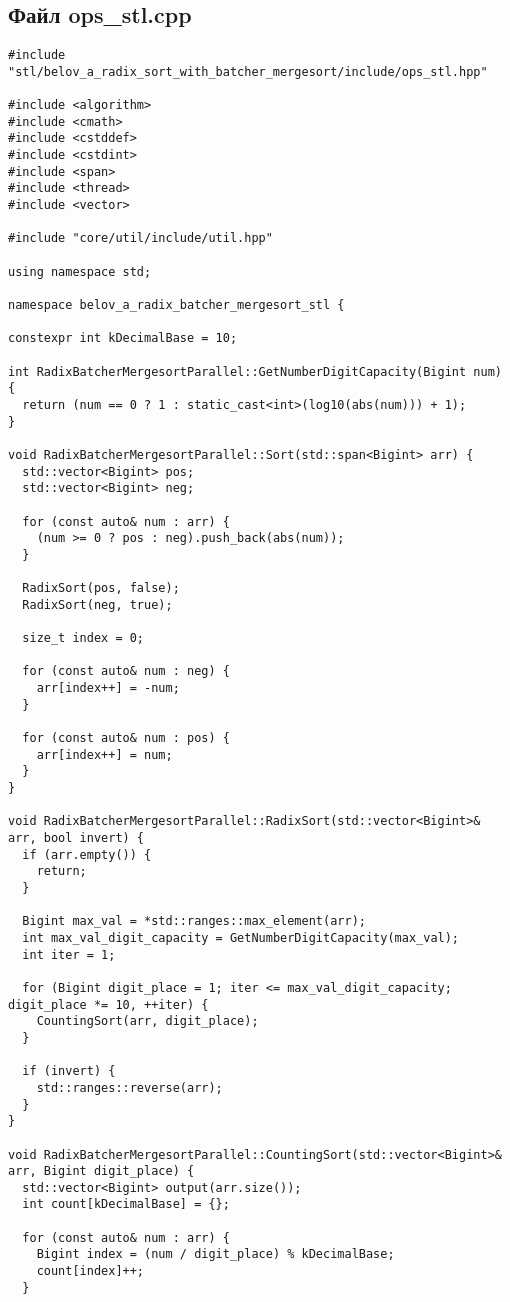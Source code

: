 \documentclass[a4paper,12pt]{article}
\begin{document}
\subsection*{Файл ops\_stl.cpp}
\begin{lstlisting}
#include "stl/belov_a_radix_sort_with_batcher_mergesort/include/ops_stl.hpp"

#include <algorithm>
#include <cmath>
#include <cstddef>
#include <cstdint>
#include <span>
#include <thread>
#include <vector>

#include "core/util/include/util.hpp"

using namespace std;

namespace belov_a_radix_batcher_mergesort_stl {

constexpr int kDecimalBase = 10;

int RadixBatcherMergesortParallel::GetNumberDigitCapacity(Bigint num) {
  return (num == 0 ? 1 : static_cast<int>(log10(abs(num))) + 1);
}

void RadixBatcherMergesortParallel::Sort(std::span<Bigint> arr) {
  std::vector<Bigint> pos;
  std::vector<Bigint> neg;

  for (const auto& num : arr) {
    (num >= 0 ? pos : neg).push_back(abs(num));
  }

  RadixSort(pos, false);
  RadixSort(neg, true);

  size_t index = 0;

  for (const auto& num : neg) {
    arr[index++] = -num;
  }

  for (const auto& num : pos) {
    arr[index++] = num;
  }
}

void RadixBatcherMergesortParallel::RadixSort(std::vector<Bigint>& arr, bool invert) {
  if (arr.empty()) {
    return;
  }

  Bigint max_val = *std::ranges::max_element(arr);
  int max_val_digit_capacity = GetNumberDigitCapacity(max_val);
  int iter = 1;

  for (Bigint digit_place = 1; iter <= max_val_digit_capacity; digit_place *= 10, ++iter) {
    CountingSort(arr, digit_place);
  }

  if (invert) {
    std::ranges::reverse(arr);
  }
}

void RadixBatcherMergesortParallel::CountingSort(std::vector<Bigint>& arr, Bigint digit_place) {
  std::vector<Bigint> output(arr.size());
  int count[kDecimalBase] = {};

  for (const auto& num : arr) {
    Bigint index = (num / digit_place) % kDecimalBase;
    count[index]++;
  }


\end{lstlisting}
\end{document}
